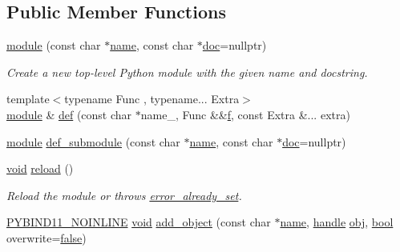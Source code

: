 \subsection*{Public Member Functions}
\begin{DoxyCompactItemize}
\item 
\mbox{\hyperlink{classmodule_abd798017921903073343c4479efb93c0}{module}} (const char $\ast$\mbox{\hyperlink{structname}{name}}, const char $\ast$\mbox{\hyperlink{structdoc}{doc}}=nullptr)
\begin{DoxyCompactList}\small\item\em Create a new top-\/level Python module with the given name and docstring. \end{DoxyCompactList}\item 
{\footnotesize template$<$typename Func , typename... Extra$>$ }\\\mbox{\hyperlink{classmodule}{module}} \& \mbox{\hyperlink{classmodule_ab17b2e694f8a83305c1b707363a1ccdf}{def}} (const char $\ast$name\+\_\+, Func \&\&\mbox{\hyperlink{_s_d_l__opengl__glext_8h_a691492ec0bd6383f91200e49f6ae40ed}{f}}, const Extra \&... extra)
\item 
\mbox{\hyperlink{classmodule}{module}} \mbox{\hyperlink{classmodule_a0e559dd7ef70d0edd90d0327ddbd0c12}{def\+\_\+submodule}} (const char $\ast$\mbox{\hyperlink{structname}{name}}, const char $\ast$\mbox{\hyperlink{structdoc}{doc}}=nullptr)
\item 
\mbox{\hyperlink{_s_d_l__opengles2__gl2ext_8h_ae5d8fa23ad07c48bb609509eae494c95}{void}} \mbox{\hyperlink{classmodule_a6ca13662c15143718888ae5cb13094b0}{reload}} ()
\begin{DoxyCompactList}\small\item\em Reload the module or throws {\ttfamily \mbox{\hyperlink{classerror__already__set}{error\+\_\+already\+\_\+set}}}. \end{DoxyCompactList}\item 
\mbox{\hyperlink{detail_2common_8h_a1fb186b7494d5c576d902c0730ecbb71}{P\+Y\+B\+I\+N\+D11\+\_\+\+N\+O\+I\+N\+L\+I\+NE}} \mbox{\hyperlink{_s_d_l__opengles2__gl2ext_8h_ae5d8fa23ad07c48bb609509eae494c95}{void}} \mbox{\hyperlink{classmodule_a96d24a509c6c0fc2beb7afa62dc9eb18}{add\+\_\+object}} (const char $\ast$\mbox{\hyperlink{structname}{name}}, \mbox{\hyperlink{classhandle}{handle}} \mbox{\hyperlink{_s_d_l__opengl__glext_8h_a0c0d4701a6c89f4f7f0640715d27ab26}{obj}}, \mbox{\hyperlink{asdl_8h_af6a258d8f3ee5206d682d799316314b1}{bool}} overwrite=\mbox{\hyperlink{asdl_8h_af6a258d8f3ee5206d682d799316314b1ae9de385ef6fe9bf3360d1038396b884c}{false}})
\end{DoxyCompactItemize}
